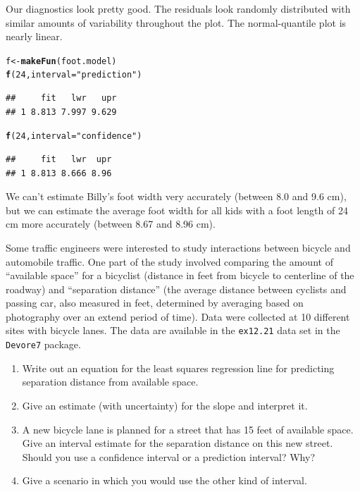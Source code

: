 \documentclass[twoside]{book}\usepackage[]{graphicx}\usepackage[]{xcolor}
\makeatletter
\newcommand{\hlnum}[1]{\textcolor[rgb]{0.686,0.059,0.569}{#1}}%
\newcommand{\hlstr}[1]{\textcolor[rgb]{0.192,0.494,0.8}{#1}}%
\newcommand{\hlstd}[1]{\textcolor[rgb]{0.345,0.345,0.345}{#1}}%
\newcommand{\hlkwb}[1]{\textcolor[rgb]{0.69,0.353,0.396}{#1}}%
\newcommand{\hlkwc}[1]{\textcolor[rgb]{0.333,0.667,0.333}{#1}}%
\newcommand{\hlkwd}[1]{\textcolor[rgb]{0.737,0.353,0.396}{\textbf{#1}}}%
\newenvironment{kframe}{%
 \def\at@end@of@kframe{}%
 \ifinner\ifhmode%
  \def\at@end@of@kframe{\end{minipage}}%
  \begin{minipage}{\columnwidth}%
 \fi\fi%
 \def\FrameCommand##1{\hskip\@totalleftmargin \hskip-\fboxsep
 \colorbox{shadecolor}{##1}\hskip-\fboxsep
     \hskip-\linewidth \hskip-\@totalleftmargin \hskip\columnwidth}%
 \MakeFramed {\advance\hsize-\width
   \@totalleftmargin\z@ \linewidth\hsize
   \@setminipage}}%
 {\par\unskip\endMakeFramed%
 \at@end@of@kframe}
\newenvironment{knitrout}{}{} %
\newcommand{\Rindex}[1]{\index{\texttt{#1}}}
\newcommand{\dataframe}[1]{{\color{blue!80!black}\texttt{#1}}\Rindex{#1}}
\newcommand{\pkg}[1]{{\color{red!80!black}\texttt{#1}}\Rindex{#1}}
\makeatother
\begin{document}
\begin{solution}
\begin{knitrout}
{}



\end{knitrout}
Our diagnostics look pretty good.  The residuals look randomly distributed with
similar amounts of variability throughout the plot.  The normal-quantile plot
is nearly linear.

\begin{knitrout}
\color{fgcolor}\begin{kframe}
\begin{alltt}
\hlstd{f} \hlkwb{<-} \hlkwd{makeFun}\hlstd{(foot.model)}
\hlkwd{f}\hlstd{(}\hlnum{24}\hlstd{,} \hlkwc{interval} \hlstd{=} \hlstr{"prediction"}\hlstd{)}
\end{alltt}
\begin{verbatim}
##     fit   lwr   upr
## 1 8.813 7.997 9.629
\end{verbatim}
\begin{alltt}
\hlkwd{f}\hlstd{(}\hlnum{24}\hlstd{,} \hlkwc{interval} \hlstd{=} \hlstr{"confidence"}\hlstd{)}
\end{alltt}
\begin{verbatim}
##     fit   lwr  upr
## 1 8.813 8.666 8.96
\end{verbatim}
\end{kframe}
\end{knitrout}
We can't estimate Billy's foot width very accurately (between 8.0 and 9.6 cm),
but we can estimate the average foot width for all kids with a foot length of
24 cm more accurately (between 8.67 and 8.96 cm).
\end{solution}

\begin{problem}
	Some traffic engineers were interested to study interactions between bicycle and 
	automobile traffic.  One part of the study involved comparing the amount of 
	``available space'' for a bicyclist 
	(distance in feet from bicycle to centerline of the roadway) and 
	``separation distance'' 
	(the average distance between cyclists and passing car, also measured in feet, 
	determined by averaging based on photography over an extend period of time).
	Data were collected at 10 different sites with bicycle lanes.
	The data are available in the \dataframe{ex12.21} data set in 
	the \pkg{Devore7} package.

	\begin{enumerate}
		\item Write out an equation for the least squares regression line for 
			predicting separation distance from available space.
		\item Give an estimate (with uncertainty) for the slope and interpret it.
		\item A new bicycle lane is planned for a street that has 15 feet of available
			space.  Give an interval estimate for the separation distance 
			on this new street.  Should you use a confidence interval or a prediction
			interval?  Why?
		\item
			Give a scenario in which you would use the other kind of interval.
	\end{enumerate}
\end{problem}
\end{document}
